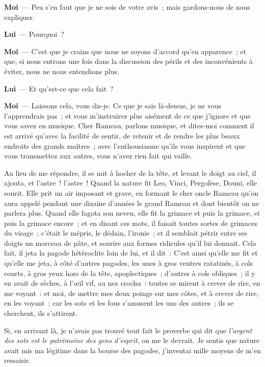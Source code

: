 \documentclass[french,twoside]{book} %
\newcommand{\labelchar}[1]{\textbf{\color{rubric} #1}}
\begin{document}
\labelchar{Moi} — Peu s’en faut que je ne sois de votre avis ; mais gardons-nous de nous expliquer.\par
\labelchar{Lui} — Pourquoi ?\par
\labelchar{Moi} — C’est que je crains que nous ne soyons d’accord qu’en apparence ; et que, si nous entrons une fois dans la discussion des périls et des inconvénients à éviter, nous ne nous entendions plus.\par
\labelchar{Lui} — Et qu’est-ce que cela fait ?\par
\labelchar{Moi} — Laissons cela, vous dis-je. Ce que je sais là-dessus, je ne vous l’apprendrais pas ; et vous m’instruirez plus aisément de ce que j’ignore et que vous savez en musique. Cher Rameau, parlons musique, et dites-moi comment il est arrivé qu’avec la facilité de sentir, de retenir et de rendre les plus beaux endroits des grands maîtres ; avec l’enthousiasme qu’ils vous inspirent et que vous transmettez aux autres, vous n’avez rien fait qui vaille.\par
Au lieu de me répondre, il se mit à hocher de la tête, et levant le doigt au ciel, il ajouta, et l’astre ! l’astre ! Quand la nature fit Leo, Vinci, Pergolèse, Douni, elle sourit. Elle prit un air imposant et grave, en formant le cher oncle Rameau qu’on aura appelé pendant une dizaine d’années le grand Rameau et dont bientôt on ne parlera plus. Quand elle fagota son neveu, elle fit la grimace et puis la grimace, et puis la grimace encore ; et en disant ces mots, il faisait toutes sortes de grimaces du visage ; c’était le mépris, le dédain, l’ironie ; et il semblait pétrir entre ses doigts un morceau de pâte, et sourire aux formes ridicules qu’il lui donnait. Cela fait, il jeta la pagode hétéroclite loin de lui, et il dit : C’est ainsi qu’elle me fit et qu’elle me jeta, à côté d’autres pagodes, les unes à gros ventres ratatinés, à cols courts, à gros yeux hors de la tête, apoplectiques ; d’autres à cols obliques ; il y en avait de sèches, à l’œil vif, au nez crochu : toutes se mirent à crever de rire, en me voyant : et moi, de mettre mes deux poings sur mes côtes, et à crever de rire, en les voyant ; car les sots et les fous s’amusent les uns des autres ; ils se cherchent, ils s’attirent.\par
Si, en arrivant là, je n’avais pas trouvé tout fait le proverbe qui dit que \emph{l’argent des sots est le patrimoine des gens d’esprit}, on me le devrait. Je sentis que nature avait mis ma légitime dans la bourse des pagodes, j’inventai mille moyens de m’en ressaisir.\par
\end{document}
